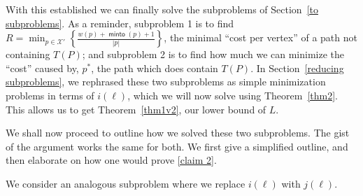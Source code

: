 \documentclass{article}
\theoremstyle{definition}
\DeclareMathOperator{\minto}{\bm{\mathsf{minto}}}
\begin{document}
With this established we can finally solve the subproblems of Section~\ref{to subproblems}. As a reminder, subproblem 1 is to find $R = \min_{p \in \mathcal{X}'}\left\{\frac{w(p)+\minto(p)+1}{|p|}\right\}$, the minimal ``cost per vertex'' of a path not containing $T(P)$; and subproblem 2 is to find how much we can minimize the ``cost'' caused by, $p^*$, the path which does contain $T(P)$. In Section~\ref{reducing subproblems}, we rephrased these two subproblems as simple minimization problems in terms of $i(\ell)$, which we will now solve using Theorem~\ref{thm2}. This allows us to get Theorem~\ref{thm1v2}, our lower bound of $L$.

 We shall now proceed to outline how we solved these two subproblems. The gist of the argument works the same for both. We first give a simplified outline, and then elaborate on how one would prove \ref{claim 2}.
 
 \vspace{1.75em}
 
We consider an analogous subproblem where we replace $i(\ell)$ with $j(\ell)$.
\end{document}
